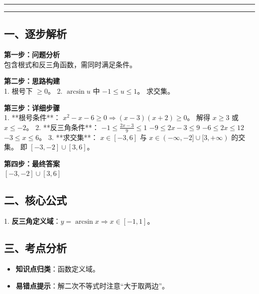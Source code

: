 \documentclass[12pt, a4paper]{ctexart}
\newcommand{\AnalysisSeparator}{
    \par\noindent\rule{\textwidth}{0.5pt}\vspace{0.2em}\hrule\vspace{0.5em} %
}
\newenvironment{RedAnalysis}{
    \par
    \color{red} %
}{
    \par
    \color{black} %
}
\begin{document}
\AnalysisSeparator

\begin{RedAnalysis}

\subsection*{一、逐步解析}

\textbf{第一步：问题分析} \\
包含根式和反三角函数，需同时满足条件。

\textbf{第二步：思路构建} \\
1. 根号下 $\ge 0$。
2. $\arcsin u$ 中 $-1 \le u \le 1$。
求交集。

\textbf{第三步：详细步骤} \\
1. **根号条件**：
   $x^2 - x - 6 \ge 0 \Rightarrow (x-3)(x+2) \ge 0$。
   解得 $x \ge 3$ 或 $x \le -2$。
2. **反三角条件**：
   $-1 \le \frac{2x-3}{9} \le 1$
   $-9 \le 2x-3 \le 9$
   $-6 \le 2x \le 12$
   $-3 \le x \le 6$。
3. **求交集**：
   $x \in [-3, 6]$ 与 $x \in (-\infty, -2] \cup [3, +\infty)$ 的交集。
   即 $[-3, -2] \cup [3, 6]$。

\textbf{第四步：最终答案} \\
$[-3, -2] \cup [3, 6]$

\subsection*{二、核心公式}
1. \textbf{反三角定义域}：$y=\arcsin x \Rightarrow x \in [-1, 1]$。

\subsection*{三、考点分析}
\begin{itemize}
    \item \textbf{知识点归类}：函数定义域。
    \item \textbf{易错点提示}：解二次不等式时注意“大于取两边”。
\end{itemize}

\end{RedAnalysis}
\end{document}
